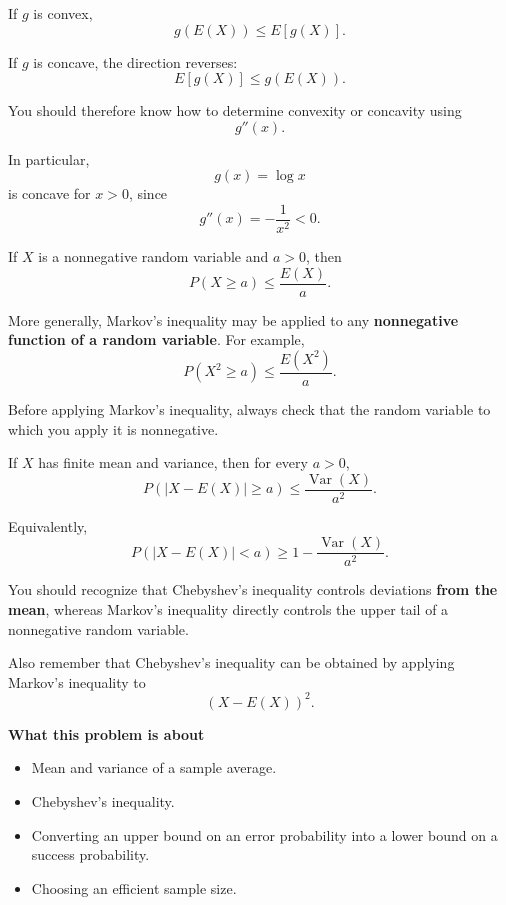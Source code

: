\documentclass[11pt]{article}
\begin{document}
\begin{toolbox}

If \(g\) is convex,
\[
g(E(X))
\leq
E[g(X)].
\]

If \(g\) is concave, the direction reverses:
\[
E[g(X)]
\leq
g(E(X)).
\]

You should therefore know how to determine convexity or concavity using
\[
g''(x).
\]

In particular,
\[
g(x)=\log x
\]
is concave for \(x>0\), since
\[
g''(x)=-\frac1{x^2}<0.
\]

\end{toolbox}

\begin{toolbox}

If \(X\) is a nonnegative random variable and \(a>0\), then
\[
P(X\geq a)
\leq
\frac{E(X)}{a}.
\]

More generally, Markov's inequality may be applied to any
\textbf{nonnegative function of a random variable}. For example,
\[
P(X^2\geq a)
\leq
\frac{E(X^2)}{a}.
\]

Before applying Markov's inequality, always check that the random variable
to which you apply it is nonnegative.

\end{toolbox}

\begin{toolbox}

If \(X\) has finite mean and variance, then for every \(a>0\),
\[
P\left(
|X-E(X)|\geq a
\right)
\leq
\frac{\operatorname{Var}(X)}{a^2}.
\]

Equivalently,
\[
P\left(
|X-E(X)|<a
\right)
\geq
1-
\frac{\operatorname{Var}(X)}{a^2}.
\]

You should recognize that Chebyshev's inequality controls deviations
\textbf{from the mean}, whereas Markov's inequality directly controls the
upper tail of a nonnegative random variable.

Also remember that Chebyshev's inequality can be obtained by applying
Markov's inequality to
\[
(X-E(X))^2.
\]

\end{toolbox}

\newpage

\begin{topicbox}

\textbf{What this problem is about}

\begin{itemize}[leftmargin=*]
    \item Mean and variance of a sample average.
    \item Chebyshev's inequality.
    \item Converting an upper bound on an error probability into a lower
    bound on a success probability.
    \item Choosing an efficient sample size.
\end{itemize}

\end{topicbox}
 
\end{document}

